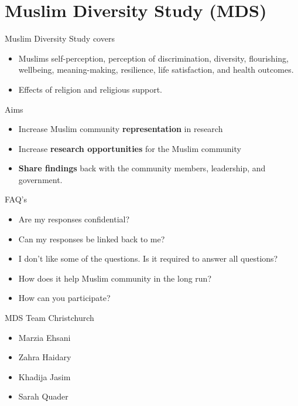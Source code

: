 \documentclass[
  ignorenonframetext,
  aspectratio=169,
]{beamer}
\providecommand{\tightlist}{%
  \setlength{\itemsep}{0pt}\setlength{\parskip}{0pt}}\usepackage{longtable,booktabs,array}
\begin{document}
\section{Muslim Diversity Study (MDS)}\label{muslim-diversity-study-mds}

\begin{frame}{Muslim Diversity Study covers}
\label{muslim-diversity-study-covers}
\begin{itemize}[<+->]
\tightlist
\item
  Muslims self-perception, perception of discrimination, diversity,
  flourishing, wellbeing, meaning-making, resilience, life satisfaction,
  and health outcomes.
\item
  Effects of religion and religious support.
\end{itemize}
\end{frame}

\begin{frame}{Aims}
\label{aims}
\begin{itemize}[<+->]
\tightlist
\item
  Increase Muslim community \textbf{representation} in research
\item
  Increase \textbf{research opportunities} for the Muslim community
\item
  \textbf{Share findings} back with the community members, leadership,
  and government.
\end{itemize}
\end{frame}

\begin{frame}{FAQ's}
\label{faqs}
\begin{itemize}[<+->]
\tightlist
\item
  Are my responses confidential?
\item
  Can my responses be linked back to me?
\item
  I don't like some of the questions. Is it required to answer all
  questions?
\item
  How does it help Muslim community in the long run?
\item
  How can you participate?
\end{itemize}
\end{frame}

\begin{frame}{MDS Team Christchurch}
\label{mds-team-christchurch}
\begin{itemize}
\tightlist
\item
  Marzia Ehsani
\item
  Zahra Haidary
\item
  Khadija Jasim
\item
  Sarah Quader
\end{itemize}
\end{frame}
\end{document}
